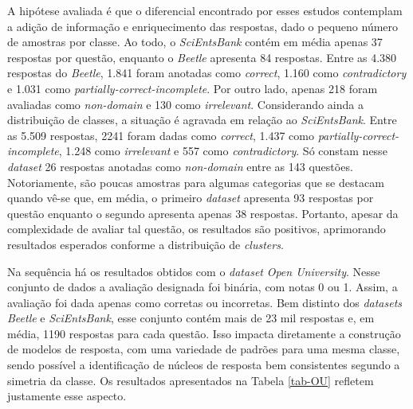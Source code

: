 A hipótese avaliada é que o diferencial encontrado por esses estudos contemplam a adição de informação e enriquecimento das respostas, dado o pequeno número de amostras por classe. Ao todo, o \textit{SciEntsBank} contém em média apenas 37 respostas por questão, enquanto o \textit{Beetle} apresenta 84 respostas. Entre as 4.380 respostas do \textit{Beetle}, 1.841 foram anotadas como \textit{correct}, 1.160 como \textit{contradictory} e 1.031 como \textit{partially-correct-incomplete}. Por outro lado, apenas 218 foram avaliadas como \textit{non-domain} e 130 como \textit{irrelevant}. Considerando ainda a distribuição de classes, a situação é agravada em relação ao \textit{SciEntsBank}. Entre as 5.509 respostas, 2241 foram dadas como \textit{correct}, 1.437 como \textit{partially-correct-incomplete}, 1.248 como \textit{irrelevant} e 557 como \textit{contradictory}. Só constam nesse \textit{dataset} 26 respostas anotadas como \textit{non-domain} entre as 143 questões. Notoriamente, são poucas amostras para algumas categorias que se destacam quando vê-se que, em média, o primeiro \textit{dataset} apresenta 93 respostas por questão enquanto o segundo apresenta apenas 38 respostas. Portanto, apesar da complexidade de avaliar tal questão, os resultados são positivos, aprimorando resultados esperados conforme a distribuição de \textit{clusters}.

Na sequência há os resultados obtidos com o \textit{dataset} \textit{Open University}. Nesse conjunto de dados a avaliação designada foi binária, com notas 0 ou 1. Assim, a avaliação foi dada apenas como corretas ou incorretas. Bem distinto dos \textit{datasets Beetle} e \textit{SciEntsBank}, esse conjunto contém mais de 23 mil respostas e, em média, 1190 respostas para cada questão. Isso impacta diretamente a construção de modelos de resposta, com uma variedade de padrões para uma mesma classe, sendo possível a identificação de núcleos de resposta bem consistentes segundo a simetria da classe. Os resultados apresentados na Tabela \ref{tab-OU} refletem justamente esse aspecto.

